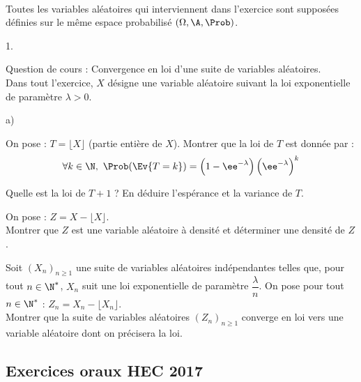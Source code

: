 
\begin{exerciceAP}~\\
Toutes les variables aléatoires qui interviennent dans l'exercice sont 
supposées définies sur le même espace probabilisé $(\Omega, 
\A,\Prob)$.
\begin{noliste}{1.}
    \setlength{\itemsep}{2mm}
  \item Question de cours : Convergence en loi d'une suite de variables 
  aléatoires.\\
  Dans tout l'exercice, $X$ désigne une variable aléatoire suivant la 
  loi exponentielle de paramètre $\lambda>0$.
  
  \item 
  \begin{noliste}{a)}
    \setlength{\itemsep}{2mm}
    \item On pose : $T=\lfloor X\rfloor$ (partie entière de $X$). 
    Montrer que la loi de $T$ est donnée par :
    \[
      \forall k \in\N, \ 
      \Prob(\Ev{T=k}) = \Big(1 - \ee^{-\lambda} \Big) \, 
      \Big(\ee^{-\lambda}\Big)^k
    \]
    
    \item Quelle est la loi de $T+1$ ? En déduire l'espérance et la 
    variance de $T$.
  \end{noliste}
  
  \item On pose : $Z=X-\lfloor X\rfloor$.\\
  Montrer que $Z$ est une variable aléatoire à densité et déterminer 
  une densité de $Z$.

  \item Soit $(X_n)_{n\geq 1}$ une suite de variables aléatoires 
  indépendantes telles que, pour tout $n\in\N^*$, $X_n$ suit une loi 
  exponentielle de paramètre $\dfrac{\lambda}{n}$. On pose pour tout 
  $n\in\N^*$ : $Z_n=X_n-\lfloor X_n\rfloor$.\\
  Montrer que la suite de variables aléatoires $(Z_n)_{n\geq 1}$ 
  converge en loi vers une variable aléatoire dont on précisera la loi.
\end{noliste}
\end{exerciceAP} 


\subsection*{Exercices oraux HEC 2017}

